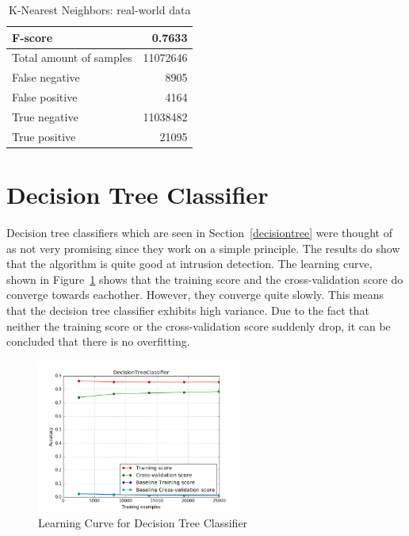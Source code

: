 \begin{table}[H]
\caption{K-Nearest Neighbors: real-world data}
\label{tab:knn:cegeka}
\centering
\begin{tabular}{l  r}
\toprule
F-score & 0.7633\\
\midrule
Total amount of samples & 11072646 \\
False negative &  8905 \\
False positive & 4164 \\
True negative &  11038482 \\
True positive & 21095 \\
\bottomrule
\end{tabular}
\end{table}

\newpage
\section{Decision Tree Classifier}

Decision tree classifiers which are seen in Section~\ref{decisiontree} were thought of as not very promising since they work on a simple principle. The results do show that the algorithm is quite good at intrusion detection. The learning curve, shown in Figure~\ref{fig:tree} shows that the training score and the cross-validation score do converge towards eachother. However, they converge quite slowly. This means that the decision tree classifier exhibits high variance. Due to the fact that neither the training score or the cross-validation score suddenly drop, it can be concluded that there is no overfitting. 

 \begin{figure}[H]
\centering
\includegraphics[width=0.6\textwidth]{Figures/Plot_DecisionTreeClassifier}
\decoRule
\caption[Learning Curve for Decision Tree Classifier]{Learning Curve for Decision Tree Classifier}
\label{fig:tree}
\end{figure}

